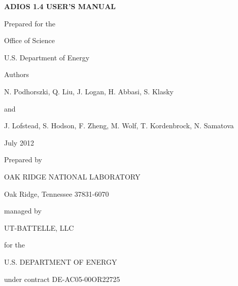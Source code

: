 \begin{center}
{\Large \textbf{ADIOS 1.4 USER'S MANUAL}}

\vspace{60pt}
Prepared for the

Office of Science

U.S. Department of Energy

\vspace{60pt}
Authors

\vspace{6pt}
N. Podhorszki, Q. Liu, J. Logan, H. Abbasi, S. Klasky

\vspace{6pt}
and 

\vspace{6pt}
J. Lofstead, S. Hodson, F. Zheng, M. Wolf, T. Kordenbrock, N. Samatova

\vspace{24pt}
July 2012

\vspace{72pt}
Prepared by

OAK RIDGE NATIONAL LABORATORY

Oak Ridge, Tennessee 37831-6070

managed by

UT-BATTELLE, LLC

for the

U.S. DEPARTMENT OF ENERGY

under contract DE-AC05-00OR22725

\end{center}


\newpage

\tableofcontents


\newpage

\listoffigures


\newpage

